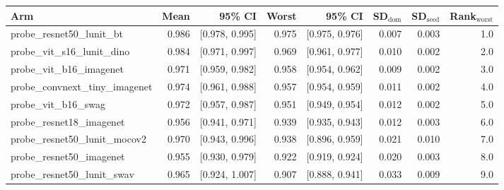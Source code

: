 \begin{tabular}{lrrrrrrr}
\toprule
Arm & Mean & 95\% CI & Worst & 95\% CI & SD$_\text{dom}$ & SD$_\text{seed}$ & Rank$_\text{worst}$ \\
\midrule
probe\_resnet50\_lunit\_bt & 0.986 & [0.978, 0.995] & 0.975 & [0.975, 0.976] & 0.007 & 0.003 & 1.0 \\
probe\_vit\_s16\_lunit\_dino & 0.984 & [0.971, 0.997] & 0.969 & [0.961, 0.977] & 0.010 & 0.002 & 2.0 \\
probe\_vit\_b16\_imagenet & 0.971 & [0.959, 0.982] & 0.958 & [0.954, 0.962] & 0.009 & 0.002 & 3.0 \\
probe\_convnext\_tiny\_imagenet & 0.974 & [0.961, 0.988] & 0.957 & [0.954, 0.959] & 0.011 & 0.002 & 4.0 \\
probe\_vit\_b16\_swag & 0.972 & [0.957, 0.987] & 0.951 & [0.949, 0.954] & 0.012 & 0.002 & 5.0 \\
probe\_resnet18\_imagenet & 0.956 & [0.941, 0.971] & 0.939 & [0.935, 0.943] & 0.012 & 0.003 & 6.0 \\
probe\_resnet50\_lunit\_mocov2 & 0.970 & [0.943, 0.996] & 0.938 & [0.896, 0.959] & 0.021 & 0.010 & 7.0 \\
probe\_resnet50\_imagenet & 0.955 & [0.930, 0.979] & 0.922 & [0.919, 0.924] & 0.020 & 0.003 & 8.0 \\
probe\_resnet50\_lunit\_swav & 0.965 & [0.924, 1.007] & 0.907 & [0.888, 0.941] & 0.033 & 0.009 & 9.0 \\
\bottomrule
\end{tabular}
